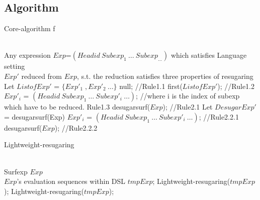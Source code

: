 \subsection{Algorithm}

\begin{algorithm}
	\caption{Core-algorithm f}
	\label{alg:f}     %
	\begin{algorithmic}[1]       %
		\REQUIRE ~~\\      %
		Any expression $Exp$=$(Headid~Subexp_{1}~\ldots~Subexp_{\ldots})$ which satisfies Language setting
		\ENSURE ~~\\     %
		$Exp'$ reduced from $Exp$, s.t. the reduction satisfies three properties of resugaring
		\STATE     Let $ListofExp'$ = $\{Exp'_{1}\;,Exp'_{2}~\ldots\}$
		\RETURN null; //\hfill Rule1.1
		\RETURN first($ListofExp'$); //\hfill Rule1.2
		\ELSE 
		\RETURN $Exp'_{i}$ = $(Headid~Subexp_{1}~\ldots~Subexp'_{i}~\ldots)$; //where i is the index of subexp which have to be reduced. \hfill Rule1.3
		\ENDIF
		\ELSE 
		\RETURN desugarsurf($Exp$); //\hfill Rule2.1
		\ELSE
		\STATE Let $DesugarExp'$ = desugarsurf(Exp)
		\RETURN $Exp'_{i}$ = $(Headid~Subexp_{1}~\ldots~Subexp'_{i}~\ldots)$; //\hfill Rule2.2.1
		\ELSE
		\RETURN desugarsurf($Exp$); //\hfill Rule2.2.2
		\ENDIF
		\ENDIF
		\ENDIF
		
	\end{algorithmic}
\end{algorithm}

\begin{algorithm}
	\caption{Lightweight-resugaring}
	\label{alg:lwresugar}     %
	\begin{algorithmic}[1]       %
		\REQUIRE ~~\\      %
		Surfexp $Exp$
		\ENSURE ~~\\     %
		$Exp$'s evaluation sequences within DSL
		\RETURN
		\PRINT $tmpExp$;
		\STATE Lightweight-resugaring($tmpExp$);
		\ELSE 
		\STATE Lightweight-resugaring($tmpExp$);
		\ENDIF
		\ENDWHILE
		
	\end{algorithmic}
\end{algorithm}
